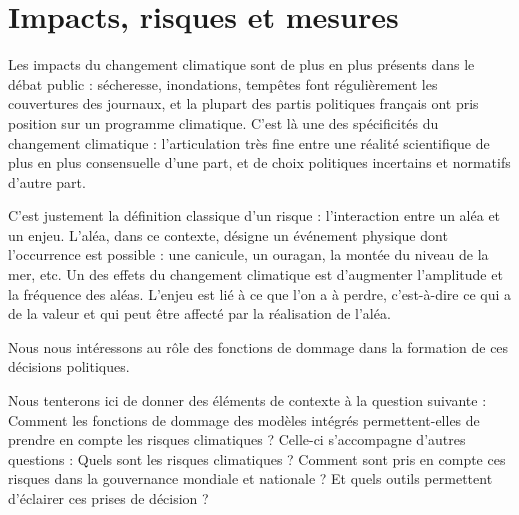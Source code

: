 \chapter{Impacts, risques et mesures}
\label{chapter:introduction}


\newpage


Les impacts du changement climatique sont de plus en plus présents dans le débat public : sécheresse, inondations, tempêtes font régulièrement les couvertures des journaux, et la plupart des partis politiques français ont pris position sur un programme climatique. C'est là une des spécificités du changement climatique : l'articulation très fine entre une réalité scientifique de plus en plus consensuelle d'une part, et de choix politiques incertains et normatifs d'autre part. 


C'est justement la définition classique d'un risque : l'interaction entre un aléa et un enjeu. L'aléa, dans ce contexte, désigne un événement physique dont l'occurrence est possible : une canicule, un ouragan, la montée du niveau de la mer, etc. Un des effets du changement climatique est d'augmenter l'amplitude et la fréquence des aléas. L'enjeu est lié à ce que l'on a à perdre, c'est-à-dire ce qui a de la valeur et qui peut être affecté par la réalisation de l'aléa. 

Nous nous intéressons au rôle des fonctions de dommage dans la formation de ces décisions politiques. 



Nous tenterons ici de donner des éléments de contexte à la question suivante : 
Comment les fonctions de dommage des modèles intégrés permettent-elles de prendre en compte les risques climatiques ? Celle-ci s'accompagne d'autres questions : Quels sont les risques climatiques ? Comment sont pris en compte ces risques dans la gouvernance mondiale et nationale ? Et quels outils permettent d'éclairer ces prises de décision ? 



